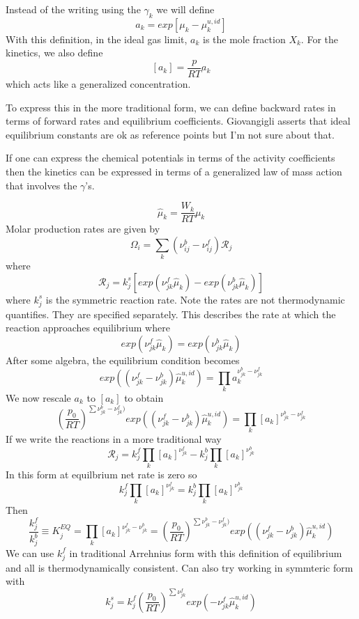 \documentclass[11pt]{article}
\begin{document}
Instead of the writing using the $\gamma_k$ we will define
\begin{equation}
a_k = exp[\mu_k - \mu_k^{u,id}]
\label{eq:deviate_ideal}
\end{equation}
With this definition, in the ideal gas limit, $a_k$ is the mole fraction $X_k$. For the kinetics,
we also define
\[
[a_k] = \frac{p}{R T}  a_k
\]
which acts like a generalized concentration.

To express this in the more traditional form, we can define backward rates in terms of forward rates
and equilibrium coefficients.  Giovangigli asserts that ideal equilibrium constants are ok as 
reference points but I'm not sure about that.

If one can express the chemical potentials in terms of the activity coefficients then the 
kinetics can be expressed in terms of a generalized law of mass action that involves the $\gamma$'s.

\[
\hat{\mu}_k = \frac{W_k}{R T}  \mu_k
\]
Molar production rates are given by
\[
\Omega_i = \sum_k (\nu_{ij}^b - \nu_{ij}^f) \mathcal{R}_j
\]
where 
\[
\mathcal{R}_j = k_j^s \left [ exp(\nu_{jk}^f \hat{\mu}_k) - exp ( \nu_{jk}^b \hat{\mu}_k) \right ] 
\]
where $k_j^s$ is the symmetric reaction rate.
Note the rates are not thermodynamic quantifies.  They are specified separately.
This describes the rate at which the reaction approaches equilibrium where
\[
 exp(\nu_{jk}^f \hat{\mu}_k) = exp ( \nu_{jk}^b \hat{\mu}_k) 
\]
After some algebra, the equilibrium condition becomes
\begin{equation}
 exp( (\nu_{jk}^f - \nu_{jk}^b) \hat{\mu}_k^{u,id}) = \prod_k a_k^{\nu_{jk}^b-\nu_{jk}^f}
\end{equation}
We now rescale $a_k$ to $[a_k]$ to obtain
\begin{equation}
\left ( \frac{p_0}{R T}  \right )^{\sum \nu_{jk}^b-\nu_{jk}^f) }exp( (\nu_{jk}^f - \nu_{jk}^b) \hat{\mu}_k^{u,id}) = \prod_k [a_k]^{\nu_{jk}^b-\nu_{jk}^f}
\label{eq:kin_equil_sym}
\end{equation}
If we write the reactions in a more traditional way
\begin{equation}
\mathcal{R}_j = k_j^f \prod_k [a_k]^{\nu_{jk}^f}
- k_j^b \prod_k [a_k]^{\nu_{jk}^b}
\end{equation}
In this form at equilbrium net rate is zero so
\begin{equation}
 k_j^f \prod_k [a_k]^{\nu_{jk}^f}
= k_j^b \prod_k [a_k]^{\nu_{jk}^b}
\end{equation}
Then
\begin{equation}
\frac{k_j^f}{k_j^b} \equiv K_j^{EQ} = 
\prod_k [a_k]^{\nu_{jk}^f - \nu_{jk}^b}
= 
\left ( \frac{p_0}{R T}  \right )^{\sum \nu_{jk}^b-\nu_{jk}^f) } exp( (\nu_{jk}^f - \nu_{jk}^b) \hat{\mu}_k^{u,id})
\label{eq:kin_equil_trad}
\end{equation}
We can use $k_j^f$ in traditional Arrehnius form with this definition of equilibrium and all is thermodynamically
consistent.  Can also try working in symmteric form with
\[
k_j^s =  k_j^f 
\left ( \frac{p_0}{R T}  \right )^{\sum \nu_{jk}^f }exp( -\nu_{jk}^f \hat{\mu}_k^{u,id})
\]
\end{document}
